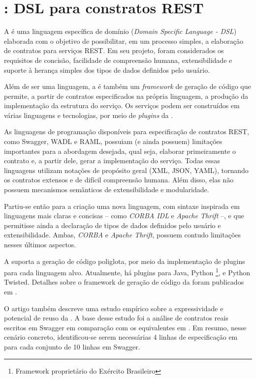 \section{\neoidl{}: DSL para constratos REST}
 

A \neoidl{} é uma linguagem específica de domínio (\textit{Domain Specific
Language - DSL}) elaborada com o objetivo de possibilitar, em um processo
simples, a elaboração de contratos para serviços REST. Em seu projeto, 
foram considerados os requisitos de concisão, facilidade de compreensão humana,
extensibilidade e suporte à herança simples dos tipos de dados definidos pelo
usuário.

Além de ser uma linguagem, a \neoidl{} é também um \textit{framework} de geração
de código que permite, a partir de contratos especificados na própria
linguagem, a produção da implementação da estrutura do serviço. Os serviços
podem ser construídos em várias linguagens e tecnologias, por meio
de \textit{plugins} da \neoidl{}.

As linguagens de programação disponíveis para especificação de
contratos REST, como Swagger\cite{swaggerSite}, WADL\cite{hadley2006web} e
RAML\cite{RAML}, possuiam (e ainda possuem) limitações importantes para a
abordagem desejada, qual seja, elaborar primeiramente o contrato e, a
partir dele, gerar a implementação do serviço. Todas essas linguagens utilizam
notações de propósito geral (XML\cite{XML}, JSON\cite{JSon}, YAML\cite{YAML}),
tornando os contratos extensos e de difícil compreensão humana. Além disso,
elas não possuem mecanismos semânticos de extensibilidade e modularidade.

Partiu-se então para a criação uma nova linguagem, com sintaxe
inspirada em linguagens mais claras e concisas -- como \emph{CORBA
IDL}\texttrademark \cite{corba} e \emph{Apache
Thrift}\texttrademark\cite{thrift} --, e que permitisse ainda a declaração de
tipos de dados definidos pelo usuário e extensibilidade. Ambas, \emph{CORBA} e
\emph{Apache Thrift}, possuem contudo limitações nesses últimos aspectos. 

A \neoidl{} suporta a geração de código poliglota, por meio da implementação de
plugins \neoidl{} para cada linguagem alvo. Atualmente, há plugins para Java,
Python \neocortex{}\footnote{Framework proprietário do Exército Brasileiro},
e Python Twisted. Detalhes sobre o
framework de geração de código da \neoidl{} foram publicados em
\cite{lima2015neoidl}. 

O artigo \cite{lima2015neoidl} também descreve uma estudo empírico sobre a
expressividade e potencial de reuso da \neoidl{}. A base desse estudo foi a
análise de contratos reais escritos em Swagger em comparação com os equivalentes
em \neoidl{}. Em resumo, nesse cenário concreto, identificou-se serem
necessárias 4 linhas de especificação em \neoidl{} para cada conjunto de 10
linhas em Swagger.

